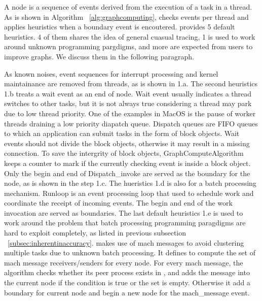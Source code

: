 A node is a sequence of events derived from the execution of a task in a thread.
As is shown in Algorithm ~\ref{alg:graphcomputing}, \xxx checks events per
thread and applies heuristics when a boundary event is encoutered. \xxx provides
5 default heuristics. 4 of them shares the idea of general cuasual tracing, 1
is used to work around unknown programming pargdigms, and more are expected
from users to improve graphs. We discuss them in the following paragraph.

As known noises, event sequences for interrupt processing and kernel
maintainance are removed from threads, as is shown in 1.a. The second heuristics
1.b treats a wait event as an end of node. Wait event usually indicates a thread
switches to other tasks, but it is not always true considering a thread may park
due to low thread priority. One of the examples in MacOS is the pause of worker
threads draining a low priority diapatch queue. Dispatch queues are FIFO queues
to which an application can submit tasks in the form of block objects. Wait
events should not divide the block objects, otherwise it may result in a missing
connection. To save the intergrity of block objects, \xxx GraphComputeAlgorithm
keeps a counter  to mark if the currently checking event is
inside a block object. Only the begin and end of Dispatch\_invoke are served
as the boundary for the node, as is shown in the step 1.c. The hueristics 1.d
is also for a batch processing mechanism. Runloop is an event processing loop
that used to schedule work and coordinate the receipt of incoming events.
The begin and end of the work invocation are served as boundaries. The last
default heuristics 1.e is used to work around the problem that batch processing
programming paragdigms are hard to exploit completely, as listed in previous
subsection ~\ref{subsec:inherentinaccuracy}. \xxx makes use of mach messages
to avoid clustering multiple tasks due to unknown batch processing. It defines
 to compute the set of mach message receivers/senders for
every node. For every mach message, the algorithm checks whether its peer
process exists in , and adds the message into the current
node if the condition is true or the set is empty. Otherwise it add a boundary
for current node and begin a new node for the mach\_message event.

